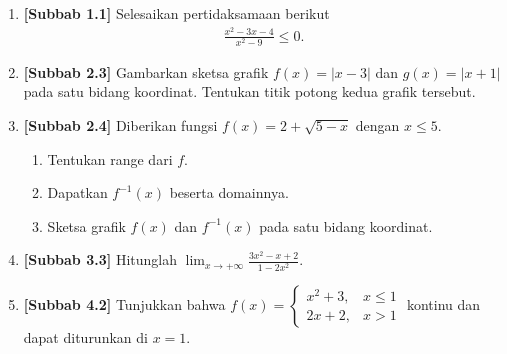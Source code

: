 \documentclass[10pt,openany,a4paper]{article}
\theoremstyle{definition}
\theoremstyle{definition}
\theoremstyle{plain}
\begin{document}
\begin{enumerate}
    \item \textbf{[Subbab 1.1]} Selesaikan pertidaksamaan berikut
    \begin{align*}
        \frac{x^2-3x-4}{x^2-9}\leq 0.
    \end{align*}

    \item \textbf{[Subbab 2.3]} Gambarkan sketsa grafik $f(x)=|x-3|$ dan $g(x)=|x+1|$ pada satu bidang koordinat. Tentukan titik potong kedua grafik tersebut.

    \item \textbf{[Subbab 2.4]} Diberikan fungsi $f(x)=2+\sqrt{5-x}$ dengan $x\leq 5$.
    \begin{enumerate}
        \item Tentukan range dari $f$.
        \item Dapatkan $f^{-1}(x)$ beserta domainnya.
        \item Sketsa grafik $f(x)$ dan $f^{-1}(x)$ pada satu bidang koordinat.
    \end{enumerate}

    \item \textbf{[Subbab 3.3]} Hitunglah $\displaystyle\lim_{x\to+\infty}\frac{3x^2-x+2}{1-2x^2}$.

    \item \textbf{[Subbab 4.2]} Tunjukkan bahwa $f(x)=\begin{cases}
        x^2+3, & x\leq 1\\
        2x+2, & x>1
    \end{cases}$ kontinu dan dapat diturunkan di $x=1$.
\end{enumerate}

\newpage
\end{document}
